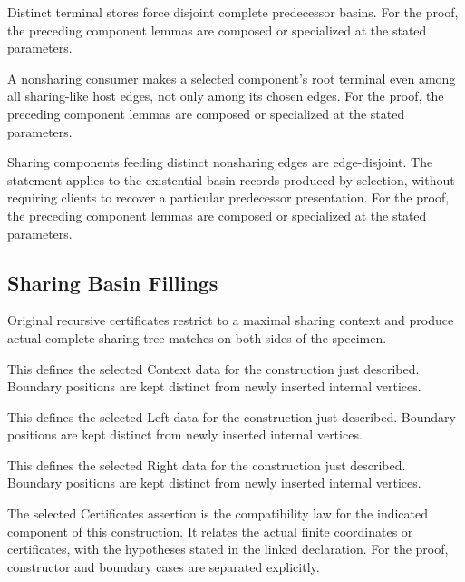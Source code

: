 Distinct terminal stores force disjoint complete predecessor basins.
For the proof, the preceding component lemmas are composed or specialized at the stated parameters.
\par{}

A nonsharing consumer makes a selected component's root terminal even among all sharing-like host edges, not only among its chosen edges.
For the proof, the preceding component lemmas are composed or specialized at the stated parameters.
\par{}

Sharing components feeding distinct nonsharing edges are edge-disjoint. The statement applies to the existential basin records produced by selection, without requiring clients to recover a particular predecessor presentation.
For the proof, the preceding component lemmas are composed or specialized at the stated parameters.
\par{}

\subsection{Sharing Basin Fillings}
Original recursive certificates restrict to a maximal sharing context and produce actual complete sharing-tree matches on both sides of the specimen.

This defines the selected Context data for the construction just described. Boundary positions are kept distinct from newly inserted internal vertices.
\par{}

This defines the selected Left data for the construction just described. Boundary positions are kept distinct from newly inserted internal vertices.
\par{}

This defines the selected Right data for the construction just described. Boundary positions are kept distinct from newly inserted internal vertices.
\par{}

The selected Certificates assertion is the compatibility law for the indicated component of this construction. It relates the actual finite coordinates or certificates, with the hypotheses stated in the linked declaration.
For the proof, constructor and boundary cases are separated explicitly.
\par{}

